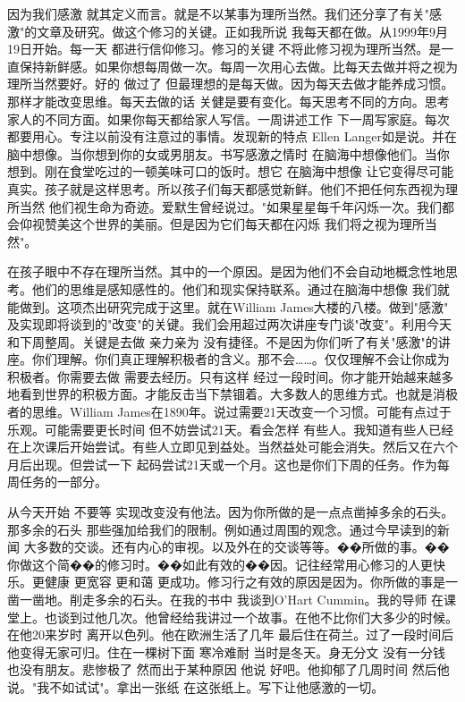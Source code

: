 因为我们感激 就其定义而言。就是不以某事为理所当然。我们还分享了有关"感激"的文章及研究。做这个修习的关键。正如我所说 我每天都在做。从1999年9月19日开始。每一天 都进行信仰修习。修习的关键 不将此修习视为理所当然。是一直保持新鲜感。如果你想每周做一次。每周一次用心去做。比每天去做并将之视为理所当然要好。好的 做过了 但最理想的是每天做。因为每天去做才能养成习惯。那样才能改变思维。每天去做的话 关健是要有变化。每天思考不同的方向。思考家人的不同方面。如果你每天都给家人写信。一周讲述工作 下一周写家庭。每次都要用心。专注以前没有注意过的事情。发现新的特点 Ellen Langer如是说。并在脑中想像。当你想到你的女或男朋友。书写感激之情时 在脑海中想像他们。当你想到。刚在食堂吃过的一顿美味可口的饭时。想它 在脑海中想像 让它变得尽可能真实。孩子就是这样思考。所以孩子们每天都感觉新鲜。他们不把任何东西视为理所当然 他们视生命为奇迹。爱默生曾经说过。"如果星星每千年闪烁一次。我们都会仰视赞美这个世界的美丽。但是因为它们每天都在闪烁 我们将之视为理所当然"。 

在孩子眼中不存在理所当然。其中的一个原因。是因为他们不会自动地概念性地思考。他们的思维是感知感性的。他们和现实保持联系。通过在脑海中想像 我们就能做到。这项杰出研究完成于这里。就在William James大楼的八楼。做到"感激" 及实现即将谈到的"改变"的关键。我们会用超过两次讲座专门谈"改变"。利用今天和下周整周。关键是去做 亲力亲为 没有捷径。不是因为你们听了有关"感激"的讲座。你们理解。你们真正理解积极者的含义。那不会……。仅仅理解不会让你成为积极者。你需要去做 需要去经历。只有这样 经过一段时间。你才能开始越来越多地看到世界的积极方面。才能反击当下禁锢着。大多数人的思维方式。也就是消极者的思维。William James在1890年。说过需要21天改变一个习惯。可能有点过于乐观。可能需要更长时间 但不妨尝试21天。看会怎样 有些人。我知道有些人已经在上次课后开始尝试。有些人立即见到益处。当然益处可能会消失。然后又在六个月后出现。但尝试一下 起码尝试21天或一个月。这也是你们下周的任务。作为每周任务的一部分。 

从今天开始 不要等 实现改变没有他法。因为你所做的是一点点凿掉多余的石头。那多余的石头 那些强加给我们的限制。例如通过周围的观念。通过今早读到的新闻 大多数的交谈。还有内心的审视。以及外在的交谈等等。��所做的事。��你做这个简��的修习时。��如此有效的��因。记往经常用心修习的人更快乐。更健康 更宽容 更和蔼 更成功。修习行之有效的原因是因为。你所做的事是一凿一凿地。削走多余的石头。在我的书中 我谈到O'Hart Cummin。我的导师 在课堂上。也谈到过他几次。他曾经给我讲过一个故事。在他不比你们大多少的时候。在他20来岁时 离开以色列。他在欧洲生活了几年 最后住在荷兰。过了一段时间后 他变得无家可归。住在一棵树下面 寒冷难耐 当时是冬天。身无分文 没有一分钱 也没有朋友。悲惨极了 然而出于某种原因 他说 好吧。他抑郁了几周时间 然后他说。"我不如试试"。拿出一张纸 在这张纸上。写下让他感激的一切。 


